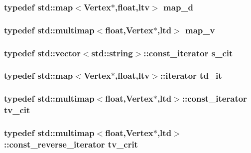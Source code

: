 \subsubsection{\setlength{\rightskip}{0pt plus 5cm}typedef std::map$<${\bf Vertex}$\ast$,float,{\bf ltv}$>$ {\bf map\_\-d}}\label{virtual__disp_8h_44c43a9206db95db8c74ddd049dddaab}


\subsubsection{\setlength{\rightskip}{0pt plus 5cm}typedef std::multimap$<$float,{\bf Vertex}$\ast$,{\bf ltd}$>$ {\bf map\_\-v}}\label{virtual__disp_8h_252de2f3101f75e629ed97d697f05706}


\subsubsection{\setlength{\rightskip}{0pt plus 5cm}typedef std::vector$<$std::string$>$::const\_\-iterator {\bf s\_\-cit}}\label{virtual__disp_8h_46ee2cf79c4d709dc5360d41b92ebdca}


\subsubsection{\setlength{\rightskip}{0pt plus 5cm}typedef std::map$<${\bf Vertex}$\ast$,float,{\bf ltv}$>$::iterator {\bf td\_\-it}}\label{virtual__disp_8h_86fe39b5e506c950131375ca899fad8a}


\subsubsection{\setlength{\rightskip}{0pt plus 5cm}typedef std::multimap$<$float,{\bf Vertex}$\ast$,{\bf ltd}$>$::const\_\-iterator {\bf tv\_\-cit}}\label{virtual__disp_8h_b5091317f8d7ba6cf2ba9f128995a1f9}


\subsubsection{\setlength{\rightskip}{0pt plus 5cm}typedef std::multimap$<$float,{\bf Vertex}$\ast$,{\bf ltd}$>$::const\_\-reverse\_\-iterator {\bf tv\_\-crit}}\label{virtual__disp_8h_8a154da16e8a2d9bec785bed26d93944}


